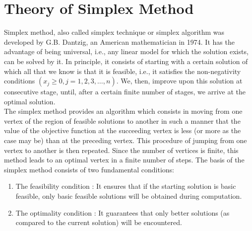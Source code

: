 \documentclass[../main-sheet.tex]{subfiles}
\begin{document}
\chapter{Theory of Simplex Method}
Simplex method, also called simplex technique or simplex algorithm was developed by
G.B. Dantzig, an American mathematician in 1974. It has the advantage of being
universal, i.e., any linear model for which the solution exists, can be solved by it.
In principle, it consists of starting with a certain solution of which all that we know is that it is feasible, i.e., it satisfies the non-negativity conditions
\((x_j \geq 0, j=1,2,3,\dots, n)\). We, then, improve upon this solution at consecutive stage, until, after a certain finite number of stages, we arrive at the optimal solution.\\
The simplex method provides an algorithm which consists in moving from one vertex
of the region of feasible solutions to another in such a manner that the value of the
objective function at the succeeding vertex is less (or more as the case may be) than at the preceding vertex. This procedure of jumping from one vertex to another is then repeated. Since the number of vertices is finite, this method leads to an optimal vertex in a finite number of steps. The basis of the simplex method consists of two fundamental conditions:
\begin{enumerate}
    \item The feasibility condition : It ensures that if the starting solution is basic feasible, only basic feasible solutions will be obtained during computation.
    \item The optimality condition : It guarantees that only better solutions (as
    compared to the current solution) will be encountered.
\end{enumerate}
\end{document}
